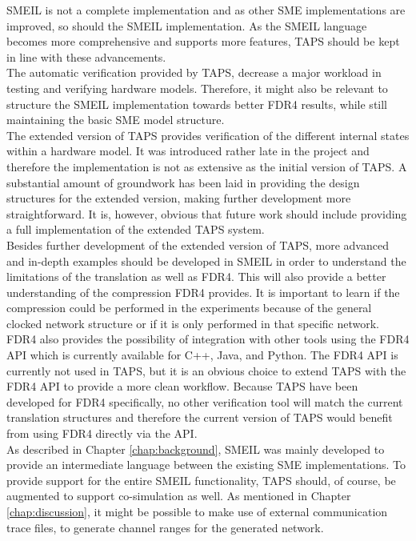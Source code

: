 
SMEIL is not a complete implementation and as other SME implementations are improved, so should the SMEIL implementation. As the SMEIL language becomes more comprehensive and supports more features, TAPS should be kept in line with these advancements.\\
The automatic verification provided by TAPS, decrease a major workload in testing and verifying hardware models. Therefore, it might also be relevant to structure the SMEIL implementation towards better FDR4 results, while still maintaining the basic SME model structure. \\

The extended version of TAPS provides verification of the different internal states within a hardware model. It was introduced rather late in the project and therefore the implementation is not as extensive as the initial version of TAPS. A substantial amount of groundwork has been laid in providing the design structures for the extended version, making further development more straightforward. It is, however, obvious that future work should include providing a full implementation of the extended TAPS system. \\

Besides further development of the extended version of TAPS, more advanced and in-depth examples should be developed in SMEIL in order to understand the limitations of the translation as well as FDR4. This will also provide a better understanding of the compression FDR4 provides. It is important to learn if the compression could be performed in the experiments because of the general clocked network structure or if it is only performed in that specific network. \\

FDR4 also provides the possibility of integration with other tools using the FDR4 API which is currently available for C++, Java, and Python. The FDR4 API is currently not used in TAPS, but it is an obvious choice to extend TAPS with the FDR4 API to provide a more clean workflow. Because TAPS have been developed for FDR4 specifically, no other verification tool will match the current translation structures and therefore the current version of TAPS would benefit from using FDR4 directly via the API.\\

As described in Chapter \ref{chap:background}, SMEIL was mainly developed to provide an intermediate language between the existing SME implementations.
To provide support for the entire SMEIL functionality, TAPS should, of course, be augmented to support co-simulation as well. As mentioned in Chapter \ref{chap:discussion}, it might be possible to make use of external communication trace files, to generate channel ranges for the generated \cspm{} network.\\


